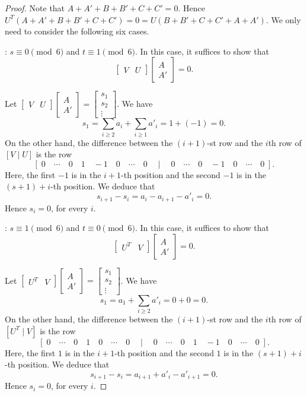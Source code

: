 \documentclass[10pt,a4paper]{amsart}
\newcommand{\A}{\mathbb{A}}
\newcommand{\s}{{Section}}
\begin{document}
\begin{proof}
Note that $A+A'+B+B'+C+C'=0$. Hence $U^T(A+A'+B+B'+C+C')=0=U(B+B'+C+C'+A+A')$. We only need to consider the following six cases.

\medskip
{}: $s\equiv 0\pmod 6$ and $t\equiv 1\pmod 6$. In this case, it suffices to show that \[\begin{bmatrix}
    V & U 
\end{bmatrix} \begin{bmatrix}
    A\\A'
\end{bmatrix}=0.\]

Let $\begin{bmatrix}
    V & U 
\end{bmatrix} \begin{bmatrix}
    A\\A'
\end{bmatrix}=\begin{bmatrix}s_1\\s_2\\\vdots\end{bmatrix}$. We have
\[
s_1=\sum_{i\geq 2}a_i+ \sum_{i\geq 1}a'_i= 1+(-1)=0.
\]
On the other hand, the difference between the $(i+1)$-st row and the $i$th row of $[V \mid U]$ is the row
\[
\left [\; 0\quad \cdots\quad 0 \quad 1 \quad -1 \quad 0\quad\cdots \quad 0\quad \mid\quad  0\quad\cdots \quad 0\quad -1\quad 0\quad\cdots \quad 0\;\right].
\]
Here, the first $-1$ is in the $i+1$-th position and the second $-1$ is in the $(s+1)+i$-th position. We deduce that
\[
s_{i+1}-s_i=a_i-a_{i+1}-a'_i=0.
\]
Hence $s_i=0$, for every $i$.


\medskip
{}: $s\equiv 1\pmod 6$ and $t\equiv 0\pmod 6$. In this case, it suffices to show that \[\begin{bmatrix}
    U^T & V 
\end{bmatrix} \begin{bmatrix}
    A\\A'
\end{bmatrix}=0.\]

Let $\begin{bmatrix}
    U^T & V 
\end{bmatrix} \begin{bmatrix}
    A\\A'
\end{bmatrix}=\begin{bmatrix}s_1\\s_2\\\vdots\end{bmatrix}$. We have
\[
s_1=a_1+ \sum_{i\geq 2}a'_i= 0+0=0.
\]
On the other hand, the difference between the $(i+1)$-st row and the $i$th row of $[U^T \mid V]$ is the row
\[
\left [\; 0\quad \cdots\quad 0 \quad 1  \quad 0\quad\cdots \quad 0\quad \mid\quad  0\quad\cdots \quad 0 \quad  1\quad -1\quad 0\quad\cdots \quad 0\;\right].
\]
Here, the first $1$ is in the $i+1$-th position and the second $1$ is in the $(s+1)+i$-th position. We deduce that
\[
s_{i+1}-s_i=a_{i+1}+a'_i-a'_{i+1}=0.
\]
Hence $s_i=0$, for every $i$.


\end{proof}
\end{document}
